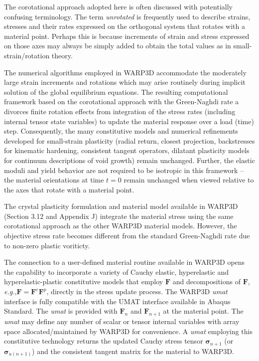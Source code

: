 \documentclass[11pt]{report}
\numberwithin{equation}{section}
\newcommand{\eg}{\emph{e.g.},\xspace}
\newcommand{\ti}{\emph}
\newcommand{\cauchy}{\boldsymbol{\sigma}}
\begin{document}
The corotational approach adopted here is often discussed with potentially confusing
terminology. The term \ti{unrotated} is frequently used to describe strains, stresses and their rates
expressed on the orthogonal system that rotates with a material point.  Perhaps this is
because increments of strain and stress expressed on those axes may always be simply added to obtain
the total values as in small-strain/rotation theory.

The  numerical algorithms  employed in WARP3D accommodate the moderately 
large strain increments 
and rotations
which may arise routinely during implicit solution of the global equilibrium 
equations.
The resulting computational framework  based on the
corotational approach with the Green-Naghdi rate a divorces finite rotation 
effects  from integration of the stress rates (including
internal tensor state variables) to update 
the material response over a load (time) step.  Consequently, the many 
constitutive models and numerical refinements developed for small-strain plasticity 
(radial return, closest projection, backstresses for kinematic hardening, 
consistent tangent operators, dilatant 
plasticity models for continuum descriptions of void growth) 
remain unchanged. Further, the elastic moduli and yield behavior are not required
to be isotropic in this framework -- the material orientations at time $t=0$ remain
unchanged when viewed relative to the axes that rotate with a material point.


The crystal plasticity formulation and material model available in WARP3D
(Section 3.12 and Appendix J) integrate the material stress using the same
corotational approach
as the other WARP3D material models.
However, the objective stress rate becomes different from the standard Green-Naghdi rate due to
non-zero plastic voriticty.


The connection to a user-defined material routine available in WARP3D opens the
capability to incorporate a variety of Cauchy elastic, hyperelastic and 
hyperelastic-plastic constitutive models 
that employ $\mathbf{F}$ and decompositions of
$\mathbf{F}$, \eg $\mathbf{F} =\mathbf{F}^e\mathbf{F}^p$, directly in the
stress update process. The WARP3D \ti{umat} interface is fully compatible with
the UMAT interface available in Abaqus Standard. The \ti{umat} is provided with 
$\mathbf{F}_n$ and $\mathbf{F}_{n+1}$ at the material point. 
The \ti{umat} may define any number of
scalar or tensor internal variables with array space allocated/maintained by WARP3D
for convenience. A \ti{umat} employing this constitutive technology
returns the updated 
Cauchy stress tensor $\cauchy_{n+1}$ (or $\cauchy_{u({n+1})}$) and the
consistent tangent matrix for the material  to WARP3D.
\end{document}
